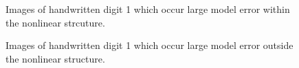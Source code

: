 \documentclass[
  12pt]{article}
\begin{document}
\begin{figure}[H]


\caption{\label{fig-sampleimgerrorwithin}Images of handwritten digit 1
which occur large model error within the nonlinear strcuture.}

\end{figure}%

\begin{figure}[H]


\caption{\label{fig-sampleimgerror}Images of handwritten digit 1 which
occur large model error outside the nonlinear structure.}

\end{figure}%
\end{document}
